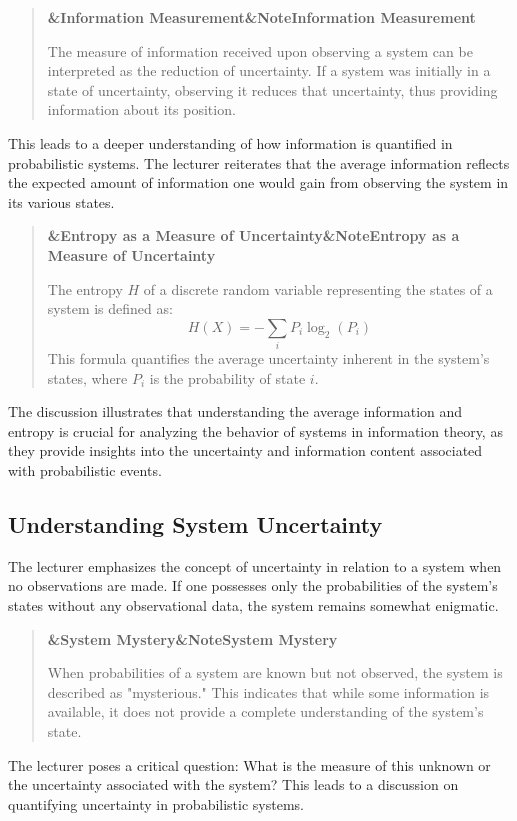 \documentclass[a4paper]{article}
\newcommand{\boxheading}[1]{%
  \par\smallskip
  \noindent\textbf{\ifx&#1&Note\else#1\fi}\par
  \smallskip
}
\newenvironment{thmbox}[1][]{%
  \begin{quote}\color{blue!60!black}\boxheading{#1}\normalcolor
}{\end{quote}}
\newenvironment{rembox}[1][]{%
  \begin{quote}\color{black!70}\boxheading{#1}\normalcolor
}{\end{quote}}
\begin{document}
\begin{rembox}[Information Measurement]
The measure of information received upon observing a system can be interpreted as the reduction of uncertainty. If a system was initially in a state of uncertainty, observing it reduces that uncertainty, thus providing information about its position.
\end{rembox}

This leads to a deeper understanding of how information is quantified in probabilistic systems. The lecturer reiterates that the average information reflects the expected amount of information one would gain from observing the system in its various states.

\begin{thmbox}[Entropy as a Measure of Uncertainty]
The entropy \( H \) of a discrete random variable representing the states of a system is defined as:
\begin{equation}
H(X) = -\sum_{i} P_i \log_2(P_i)
\end{equation}
This formula quantifies the average uncertainty inherent in the system's states, where \( P_i \) is the probability of state \( i \).
\end{thmbox}

The discussion illustrates that understanding the average information and entropy is crucial for analyzing the behavior of systems in information theory, as they provide insights into the uncertainty and information content associated with probabilistic events.

\subsection{Understanding System Uncertainty}
The lecturer emphasizes the concept of uncertainty in relation to a system when no observations are made. If one possesses only the probabilities of the system's states without any observational data, the system remains somewhat enigmatic.

\begin{rembox}[System Mystery]
When probabilities of a system are known but not observed, the system is described as "mysterious." This indicates that while some information is available, it does not provide a complete understanding of the system's state.
\end{rembox}

The lecturer poses a critical question: What is the measure of this unknown or the uncertainty associated with the system? This leads to a discussion on quantifying uncertainty in probabilistic systems.
\end{document}
